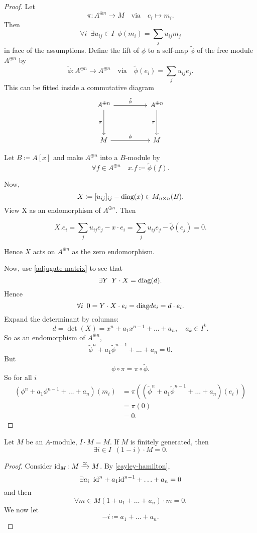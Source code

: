 \begin{proof}
  \label{cayley-hamilton}
  Let
  \[ \pi \colon A^{\oplus n} \to M \quad \text{via} \quad e_i \mapsto m_i. \]
  Then
  \[ \forall i \enspace \exists u_{ij} \in I \enspace \phi(m_i) = \sum_j u_{ij} m_j\]
  in face of the assumptions.
  Define the lift of $\phi$ to a self-map $\tilde{\phi}$ of the free module $A^{\oplus n}$ by
  \[ \tilde \phi \colon A^{\oplus n} \to A^{\oplus n} \quad \text{via} \quad \tilde \phi(e_i) = \sum_j u_{ij} e_j.\]
  This can be fitted inside a commutative diagram
  \begin{equation*}
    \begin{tikzcd}[row sep=huge, column sep=huge]
      A^{\oplus n} \arrow[swap]{d}{\pi} \arrow{r}{\tilde{\phi}}
      & A^{\oplus n} \arrow[swap]{d}{\pi} \\
      M \arrow{r}{\phi}
      & M
    \end{tikzcd}
  \end{equation*}

Let $B \coloneqq A[x]$ and make $A^{\oplus n}$ into a $B$-module by
\[ \forall f \in A^{\oplus n} \quad x . f \coloneqq \tilde{\phi}(f).\]

Now,
\[ X \coloneqq [u_{ij}]_{ij} - \text{diag}(x) \in M_{n \times n} (B).\]
View X as an endomorphism of $A^{\oplus n}$. Then

\[ X . e_i = \sum_j u_{ij} e_j - x \cdot e_i = \sum_j u_{ij} e_j - \tilde{\phi}(e_j) = 0.\]

Hence $X$ acts on $A^{\oplus n}$ as the zero endomorphism.

Now, use \cref{adjugate matrix} to see that
\[ \exists Y \enspace Y \cdot X = \text{diag}(d).\]
Hence
\[ \forall i \enspace 0 = Y \cdot X \cdot e_i = \text{diag}{d} e_i = d \cdot e_i.\]
Expand the determinant by columns:
\[ d = \det(X) = x^n + a_1 x^{n-1} + \dotsc + a_n, \quad a_k \in I^k.\]
So as an endomorphism of $A^{\oplus n}$,
\[\tilde{\phi}^n + a_1 \tilde{\phi}^{n-1} + \dotsc + a_n = 0.\]
But
\[ \phi \circ \pi = \pi \circ \tilde{\phi}.\]
So for all $i$
\begin{align*}
  (\phi^n + a_1 \phi^{n-1} + \dotsc + a_n)(m_i) & = \pi((\tilde{\phi}^n + a_1 \tilde{\phi}^{n-1} + \dotsc + a_n)(e_i)) \\
            & = \pi (0) \\
            & = 0.
\end{align*}
\end{proof}

\begin{lemma}[Nakayama]
  \label{nakayama}
  Let $M$ be an $A$-module, $I \cdot M = M$. If $M$ is finitely generated, then
  \[ \exists i \in I \enspace (1 - i) \cdot M = 0.\]
\end{lemma}
\begin{proof}
  Consider $\text{id}_M \colon M \xrightarrow{\simeq} M$.
  By \cref{cayley-hamilton},
  \[ \exists a_i \enspace \text{id}^n + a_1 \text{id}^{n-1} + \dotsc + a_n = 0\]
  and then
  \[ \forall m \in M (1 + a_1 + \dotsc + a_n) \cdot m = 0.\]
  We now let
  \[ -i \coloneqq a_1 + \dotsc + a_n.\]
\end{proof}

